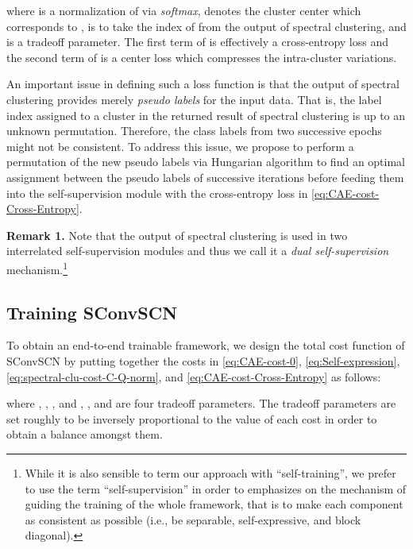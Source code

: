 \documentclass[10pt,twocolumn,letterpaper]{article}
\def\ie{i.e.}
\newcommand{\myparagraph}[1]{\smallskip\noindent\textbf{#1.}}
\def\ie{i.e.}
\begin{document}
where  is a normalization of  via \emph{softmax},
 denotes the cluster center which corresponds to ,  is to take the index of  from the output of spectral clustering, and  is a tradeoff parameter. The first term of   is effectively a cross-entropy loss and the second term of  is a center loss which compresses the intra-cluster variations.







An important issue in defining such a loss function is that the output of spectral clustering  provides merely \emph{pseudo labels} for the input data. That is, the label index assigned to a cluster in the returned result of spectral clustering is up to an unknown permutation.
Therefore, the class labels from two successive epochs might not be consistent.
To address this issue, we propose to perform a permutation of the new pseudo labels via Hungarian algorithm \cite{Munkres:JSIAM57} to find an optimal assignment between the pseudo labels of successive iterations
before feeding them into the self-supervision module with the cross-entropy loss in \eqref{eq:CAE-cost-Cross-Entropy}.

\myparagraph{Remark 1} Note that the output of spectral clustering is used in two interrelated self-supervision modules and thus we call it a \emph{dual self-supervision} mechanism.\footnote{
While it is also sensible to term our approach with ``self-training'', we prefer to use the term ``self-supervision'' in order to emphasizes on the mechanism of guiding the training of the whole framework, that is to make each component as consistent as possible (\ie, be separable, self-expressive, and block diagonal).}


\subsection{Training SConvSCN}
\label{sec:training-ConvSSCNet}

To obtain an end-to-end trainable framework, we design the total cost function of SConvSCN by putting together the costs in \eqref{eq:CAE-cost-0}, \eqref{eq:Self-expression}, \eqref{eq:spectral-clu-cost-C-Q-norm}, and \eqref{eq:CAE-cost-Cross-Entropy} as follows:

where ,
,
,
and , ,  and  are four tradeoff parameters.
The tradeoff parameters are set roughly to be inversely proportional to the value of each cost in order to obtain a balance amongst them.
\end{document}
